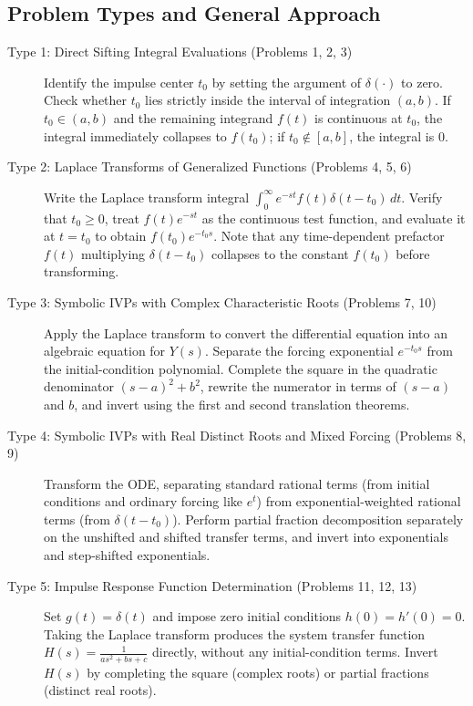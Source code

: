 \documentclass[11pt, letterpaper]{article}
\theoremstyle{definition}
\theoremstyle{remark}
\begin{document}
\subsection{Problem Types and General Approach}
\begin{description}
    \item[Type 1: Direct Sifting Integral Evaluations (Problems 1, 2, 3)]
    Identify the impulse center $t_0$ by setting the argument of $\delta(\cdot)$ to zero. Check whether $t_0$ lies strictly inside the interval of integration $(a, b)$. If $t_0 \in (a, b)$ and the remaining integrand $f(t)$ is continuous at $t_0$, the integral immediately collapses to $f(t_0)$; if $t_0 \notin [a, b]$, the integral is $0$.

    \item[Type 2: Laplace Transforms of Generalized Functions (Problems 4, 5, 6)]
    Write the Laplace transform integral $\int_0^{\infty} e^{-st} f(t)\delta(t - t_0)\,dt$. Verify that $t_0 \ge 0$, treat $f(t)e^{-st}$ as the continuous test function, and evaluate it at $t = t_0$ to obtain $f(t_0)e^{-t_0 s}$. Note that any time-dependent prefactor $f(t)$ multiplying $\delta(t - t_0)$ collapses to the constant $f(t_0)$ before transforming.

    \item[Type 3: Symbolic IVPs with Complex Characteristic Roots (Problems 7, 10)]
    Apply the Laplace transform to convert the differential equation into an algebraic equation for $Y(s)$. Separate the forcing exponential $e^{-t_0 s}$ from the initial-condition polynomial. Complete the square in the quadratic denominator $(s - a)^2 + b^2$, rewrite the numerator in terms of $(s - a)$ and $b$, and invert using the first and second translation theorems.

    \item[Type 4: Symbolic IVPs with Real Distinct Roots and Mixed Forcing (Problems 8, 9)]
    Transform the ODE, separating standard rational terms (from initial conditions and ordinary forcing like $e^t$) from exponential-weighted rational terms (from $\delta(t - t_0)$). Perform partial fraction decomposition separately on the unshifted and shifted transfer terms, and invert into exponentials and step-shifted exponentials.

    \item[Type 5: Impulse Response Function Determination (Problems 11, 12, 13)]
    Set $g(t) = \delta(t)$ and impose zero initial conditions $h(0) = h'(0) = 0$. Taking the Laplace transform produces the system transfer function $H(s) = \frac{1}{as^2 + bs + c}$ directly, without any initial-condition terms. Invert $H(s)$ by completing the square (complex roots) or partial fractions (distinct real roots).


\end{description}
\end{document}
